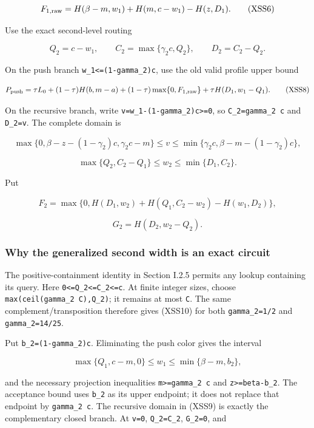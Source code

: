 \[
F_{1,\rm raw}=H(\beta-m,w_1)+H(m,c-w_1)-H(z,D_1).
 \tag{XSS6}
\]

Use the exact second-level routing

\[
Q_2=c-w_1,\qquad C_2=\max\{\gamma_2c,Q_2\},\qquad D_2=C_2-Q_2.
 \tag{XSS7}
\]

On the push branch \texttt{w\_1\textless{}=(1-gamma\_2)c}, use the old valid profile upper bound

\[
P_{\rm push}=\tau L_0+(1-\tau)H(b,m-a)
 +(1-\tau)\max\{0,F_{1,\rm raw}\}
 +\tau H(D_1,w_1-Q_1).
 \tag{XSS8}
\]

On the recursive branch, write \texttt{v=w\_1-(1-gamma\_2)c\textgreater{}=0}, so \texttt{C\_2=gamma\_2\ c} and \texttt{D\_2=v}. The complete domain is

\[
\max\{0,\beta-z-(1-\gamma_2)c,\gamma_2c-m\}\le v
 \le\min\{\gamma_2c,\beta-m-(1-\gamma_2)c\},
\]

\[
\max\{Q_2,C_2-Q_1\}\le w_2\le\min\{D_1,C_2\}.
 \tag{XSS9}
\]

Put

\[
F_2=\max\{0,H(D_1,w_2)+H(Q_1,C_2-w_2)-H(w_1,D_2)\},
\]

\[
G_2=H(D_2,w_2-Q_2).
 \tag{XSS10}
\]

\hypertarget{af-a9ec399514-why-the-generalized-second-width-is-an-exact-circuit}{%
\subsubsection{Why the generalized second width is an exact circuit}\label{af-a9ec399514-why-the-generalized-second-width-is-an-exact-circuit}}

The positive-containment identity in Section I.2.5 permits any lookup containing its query. Here \texttt{0\textless{}=Q\_2\textless{}=C\_2\textless{}=c}. At finite integer sizes, choose \texttt{max(ceil(gamma\_2\ \textbar{}C\textbar{}),\textbar{}Q\_2\textbar{})}; it remains at most \texttt{\textbar{}C\textbar{}}. The same complement/transposition therefore gives (XSS10) for both \texttt{gamma\_2=1/2} and \texttt{gamma\_2=14/25}.

Put \texttt{b\_2=(1-gamma\_2)c}. Eliminating the push color gives the interval

\[
\max\{Q_1,c-m,0\}\le w_1\le\min\{\beta-m,b_2\},
\]

and the necessary projection inequalities \texttt{m\textgreater{}=gamma\_2\ c} and \texttt{z\textgreater{}=beta-b\_2}. The acceptance bound uses \texttt{b\_2} as its upper endpoint; it does not replace that endpoint by \texttt{gamma\_2\ c}. The recursive domain in (XSS9) is exactly the complementary closed branch. At \texttt{v=0}, \texttt{Q\_2=C\_2}, \texttt{G\_2=0}, and

